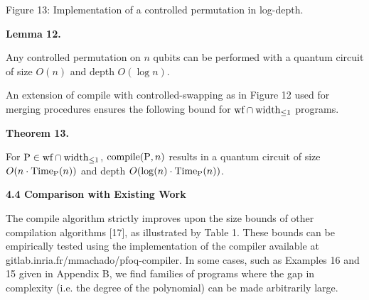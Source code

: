 Figure 13: Implementation of a controlled permutation in log-depth.\par
 
 
 
\par\medskip\noindent\textbf{Lemma 12.}\par
 
 
Any controlled permutation on $n$ qubits can be performed with a quantum circuit of size $O(n)$ and depth $O(\log n)$.\par
 
 
 
 
An extension of compile with controlled-swapping as in Figure 12 used for merging procedures ensures the following bound for $\textnormal{{wf}}\cap\textnormal{{width}}_{\leq 1}$ programs.\par
 
 
 
\par\medskip\noindent\textbf{Theorem 13.}\par
 
 
For $\mathrm{P}\in\textnormal{{wf}}\cap\textnormal{{width}}_{\leq 1}$, $\textnormal{{{compile}}{}}(\mathrm{P},n)$ results in a quantum circuit of size $O(n\cdot\textnormal{Time}_{\mathrm{P}}(n))$ and depth ${O}(\log(n)\cdot\textnormal{Time}_{\mathrm{P}}(n))$.\par
 
 
 
 
 
\par\medskip\noindent\textbf{4.4 Comparison with Existing Work}\par
 
 
The compile algorithm strictly improves upon the size bounds of other compilation algorithms [17], as illustrated by Table 1. These bounds can be empirically tested using the implementation of the compiler available at gitlab.inria.fr/mmachado/pfoq-compiler. In some cases, such as Examples 16 and 15 given in Appendix B, we find families of programs where the gap in complexity (i.e. the degree of the polynomial) can be made arbitrarily large.\par
 
